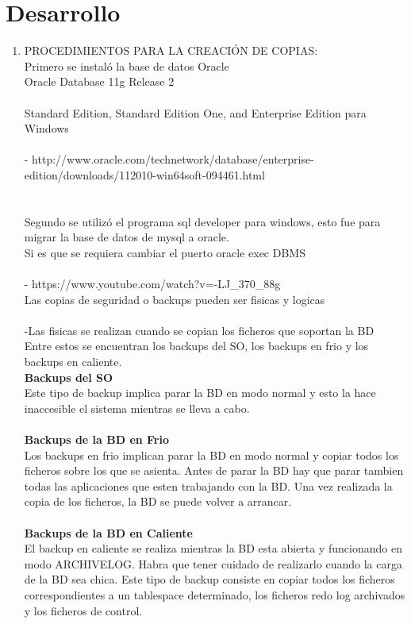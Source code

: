 \documentclass[a4paper,twocolumn,10pt]{article}
\begin{document}
\section{Desarrollo}
\begin{enumerate}[4.1]
\item  PROCEDIMIENTOS PARA LA CREACI\'ON DE COPIAS:
\\Primero se instal\'o la base de datos Oracle
\\Oracle Database 11g Release 2\\
\\Standard Edition, Standard Edition One, and Enterprise Edition para Windows\\
\\
- http://www.oracle.com/technetwork/database/enterprise-edition/downloads/112010-win64soft-094461.html\\
\\
\\Segundo se utiliz\'o el programa sql developer para windows, esto fue para migrar la base de datos de mysql a oracle.
\\Si es que se requiera cambiar el puerto  oracle exec DBMS
\\
\\- https://www.youtube.com/watch?v=-LJ\_370\_88g
\\Las copias de seguridad o backups pueden ser fisicas y logicas
\\
\\-Las fisicas se realizan cuando se copian los ficheros que soportan la BD
\\ Entre estos se encuentran los backups del SO, los backups en frio y los backups en caliente.
\\
\textbf{ Backups del SO}         
\\           Este tipo de backup implica parar la BD en modo normal y esto la hace inaccesible el sistema mientras se lleva a cabo.
\\
\\
\textbf{ Backups de la BD en Frio}         
\\          Los backups en frio implican parar la BD en modo normal y copiar todos los ficheros sobre los que se asienta. Antes de parar la BD hay que parar tambien todas las aplicaciones que esten trabajando con la BD. Una vez realizada la copia de los ficheros, la BD se puede volver a arrancar.
\\
\\
\textbf{Backups de la BD en Caliente}            
\\          El backup en caliente se realiza mientras la BD esta abierta y funcionando en modo ARCHIVELOG. Habra que tener cuidado de realizarlo cuando la carga de la BD sea chica. Este tipo de backup consiste en copiar todos los ficheros correspondientes a un tablespace determinado, los ficheros redo log archivados y los ficheros de control.
\\


\end{enumerate}
\end{document}
